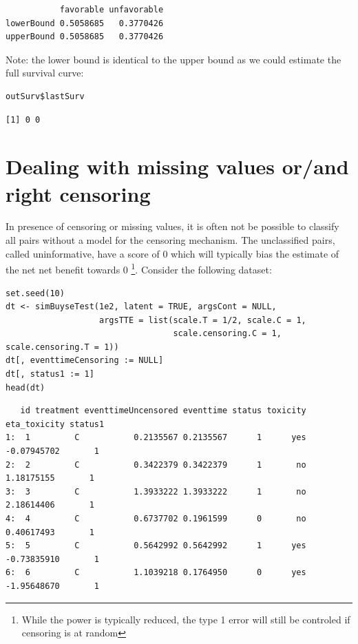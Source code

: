 \documentclass[12pt]{article}
\begin{document}
\begin{verbatim}
           favorable unfavorable
lowerBound 0.5058685   0.3770426
upperBound 0.5058685   0.3770426
\end{verbatim}


Note: the lower bound is identical to the upper bound as we could
estimate the full survival curve:
\lstset{language=r,label= ,caption= ,captionpos=b,numbers=none}
\begin{lstlisting}
outSurv$lastSurv
\end{lstlisting}

\begin{verbatim}
[1] 0 0
\end{verbatim}


\clearpage

\section{Dealing with missing values or/and right censoring}
\label{sec:orgdced178}

In presence of censoring or missing values, it is often not be
 possible to classify all pairs without a model for the censoring
 mechanism. The unclassified pairs, called uninformative, have a score
 of 0 which will typically bias the estimate of the net net benefit
 towards 0 \footnote{While the power is typically reduced, the type 1 error
 will still be controled if censoring is at random}. Consider the
 following dataset:
\lstset{language=r,label= ,caption= ,captionpos=b,numbers=none}
\begin{lstlisting}
set.seed(10)
dt <- simBuyseTest(1e2, latent = TRUE, argsCont = NULL,
                   argsTTE = list(scale.T = 1/2, scale.C = 1,
                                  scale.censoring.C = 1, scale.censoring.T = 1))
dt[, eventtimeCensoring := NULL]
dt[, status1 := 1]
head(dt)
\end{lstlisting}

\begin{verbatim}
   id treatment eventtimeUncensored eventtime status toxicity eta_toxicity status1
1:  1         C           0.2135567 0.2135567      1      yes  -0.07945702       1
2:  2         C           0.3422379 0.3422379      1       no   1.18175155       1
3:  3         C           1.3933222 1.3933222      1       no   2.18614406       1
4:  4         C           0.6737702 0.1961599      0       no   0.40617493       1
5:  5         C           0.5642992 0.5642992      1      yes  -0.73835910       1
6:  6         C           1.1039218 0.1764950      0      yes  -1.95648670       1
\end{verbatim}
\end{document}

